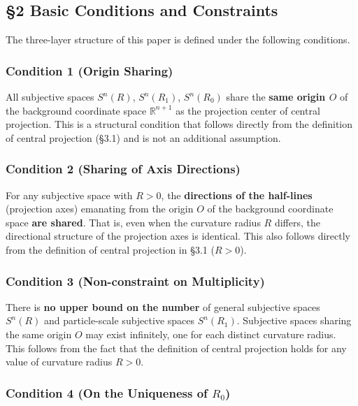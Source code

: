 \documentclass[
  a4paper,11pt]{article}
\begin{document}
\subsection{§2 Basic Conditions and
Constraints}\label{basic-conditions-and-constraints}

The three-layer structure of this paper is defined under the following
conditions.

\subsubsection{Condition 1 (Origin
Sharing)}\label{condition-1-origin-sharing}

All subjective spaces \(S^n(R)\), \(S^n(R_1)\), \(S^n(R_0)\) share the
\textbf{same origin \(O\)} of the background coordinate space
\(\mathbb{R}^{n+1}\) as the projection center of central projection.
This is a structural condition that follows directly from the definition
of central projection (§3.1) and is not an additional assumption.

\subsubsection{Condition 2 (Sharing of Axis
Directions)}\label{condition-2-sharing-of-axis-directions}

For any subjective space with \(R > 0\), the \textbf{directions of the
half-lines} (projection axes) emanating from the origin \(O\) of the
background coordinate space \textbf{are shared}. That is, even when the
curvature radius \(R\) differs, the directional structure of the
projection axes is identical. This also follows directly from the
definition of central projection in §3.1 (\(R > 0\)).

\subsubsection{Condition 3 (Non-constraint on
Multiplicity)}\label{condition-3-non-constraint-on-multiplicity}

There is \textbf{no upper bound on the number} of general subjective
spaces \(S^n(R)\) and particle-scale subjective spaces \(S^n(R_1)\).
Subjective spaces sharing the same origin \(O\) may exist infinitely,
one for each distinct curvature radius. This follows from the fact that
the definition of central projection holds for any value of curvature
radius \(R > 0\).

\subsubsection{\texorpdfstring{Condition 4 (On the Uniqueness of
\(R_0\))}{Condition 4 (On the Uniqueness of R\_0)}}\label{condition-4-on-the-uniqueness-of-r_0}
\end{document}
